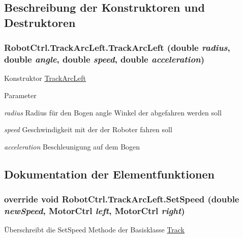 \subsection{Beschreibung der Konstruktoren und Destruktoren}
\hypertarget{class_robot_ctrl_1_1_track_arc_left_a405f8fa89cf86603b3696a282d05dcff}{
\subsubsection[{TrackArcLeft}]{\setlength{\rightskip}{0pt plus 5cm}RobotCtrl.TrackArcLeft.TrackArcLeft (double {\em radius}, \/  double {\em angle}, \/  double {\em speed}, \/  double {\em acceleration})}}
\label{class_robot_ctrl_1_1_track_arc_left_a405f8fa89cf86603b3696a282d05dcff}
Konstruktor \hyperlink{class_robot_ctrl_1_1_track_arc_left}{TrackArcLeft}


\begin{DoxyParams}{Parameter}
\item[{\em radius}]Radius f\"{u}r den Bogen  angle Winkel der abgefahren werden soll \item[{\em speed}]Geschwindigkeit mit der der Roboter fahren soll \item[{\em acceleration}]Beschleunigung auf dem Bogen \end{DoxyParams}


\subsection{Dokumentation der Elementfunktionen}
\hypertarget{class_robot_ctrl_1_1_track_arc_left_aee8e8c1da176807436c2946e39bbd6ae}{
\subsubsection[{SetSpeed}]{\setlength{\rightskip}{0pt plus 5cm}override void RobotCtrl.TrackArcLeft.SetSpeed (double {\em newSpeed}, \/  {\bf MotorCtrl} {\em left}, \/  {\bf MotorCtrl} {\em right})}}
\label{class_robot_ctrl_1_1_track_arc_left_aee8e8c1da176807436c2946e39bbd6ae}
\"{U}berschreibt die SetSpeed Methode der Basisklasse \hyperlink{class_robot_ctrl_1_1_track}{Track}


